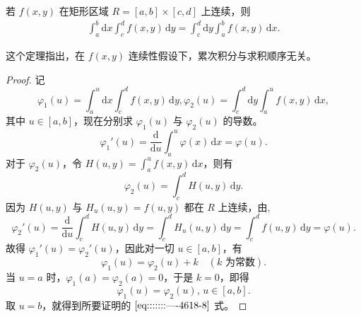 \documentclass[../../main.tex]{subfiles}
\begin{document}
\begin{theorem}
若 \( f(x,y) \) 在矩形区域 \( R = [a,b] \times [c,d] \) 上连续，则
\begin{align}
\int_{a}^{b} \mathrm{d}x \int_{c}^{d} f(x,y) \, \mathrm{d}y = \int_{c}^{d} \mathrm{d}y \int_{a}^{b} f(x,y) \, \mathrm{d}x. \label{eq:::::::----4618-8}
\end{align}
\end{theorem}
\begin{note}
这个定理指出，在 \( f(x,y) \) 连续性假设下，累次积分与求积顺序无关。
\end{note}
\begin{proof}
记
\[
\varphi_1(u) = \int_{a}^{u} \mathrm{d}x \int_{c}^{d} f(x,y) \, \mathrm{d}y,
\varphi_2(u) = \int_{c}^{d} \mathrm{d}y \int_{a}^{u} f(x,y) \, \mathrm{d}x,
\]
其中 \( u \in [a,b] \)，现在分别求 \( \varphi_1(u) \) 与 \( \varphi_2(u) \) 的导数。
\[
\varphi_1'(u) = \frac{\mathrm{d}}{\mathrm{d}u} \int_{a}^{u} \varphi(x) \, \mathrm{d}x = \varphi(u).
\]
对于 \( \varphi_2(u) \)，令 \( H(u,y) = \int_{a}^{u} f(x,y) \, \mathrm{d}x \)，则有
\[
\varphi_2(u) = \int_{c}^{d} H(u,y) \, \mathrm{d}y.
\]
因为 \( H(u,y) \) 与 \( H_u(u,y) = f(u,y) \) 都在 \( R \) 上连续，由,
\[
\varphi_2'(u) = \frac{\mathrm{d}}{\mathrm{d}u} \int_{c}^{d} H(u,y) \, \mathrm{d}y = \int_{c}^{d} H_u(u,y) \, \mathrm{d}y
= \int_{c}^{d} f(u,y) \, \mathrm{d}y = \varphi(u).
\]
故得 \( \varphi_1'(u) = \varphi_2'(u) \)，因此对一切 \( u \in [a,b] \)，有
\[
\varphi_1(u) = \varphi_2(u) + k \quad (k \text{ 为常数}).
\]
当 \( u = a \) 时，\( \varphi_1(a) = \varphi_2(a) = 0 \)，于是 \( k = 0 \)，即得
\[
\varphi_1(u) = \varphi_2(u), \, u \in [a,b].
\]
取 \( u = b \)，就得到所要证明的 \(\eqref{eq:::::::----4618-8}\) 式。
\end{proof}
\end{document}
